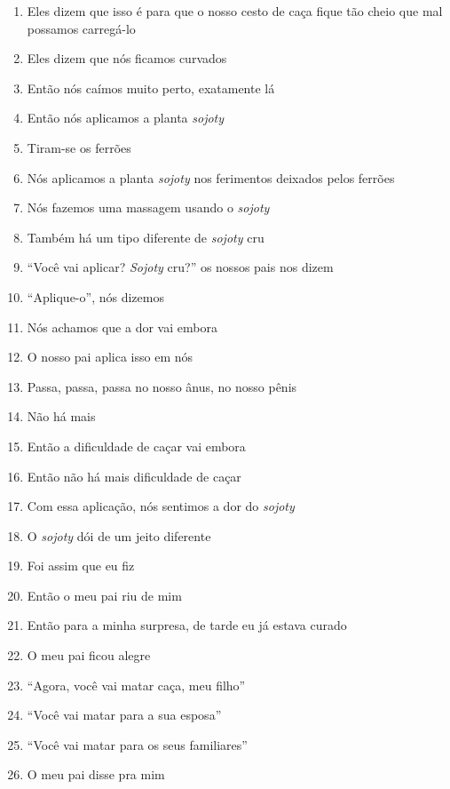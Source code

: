\begin{enumerate}
 \begin{center}\end{center}
 
 \item Eles dizem que isso é para que o nosso cesto de caça fique tão cheio
 que mal possamos carregá-lo
 \item Eles dizem que nós ficamos curvados
 \item Então nós caímos muito perto, exatamente lá
 
 \begin{center}\end{center}
 
 \item Então nós aplicamos a planta \textit{sojoty}
 \item Tiram-se os ferrões
 \item Nós aplicamos a planta \textit{sojoty} nos ferimentos deixados pelos
 ferrões
 \item Nós fazemos uma massagem usando o \textit{sojoty}
 \item Também há um tipo diferente de \textit{sojoty} cru
 \item ``Você vai aplicar? \textit{Sojoty} cru?'' os nossos pais nos dizem
 \item ``Aplique-o'', nós dizemos
 \item Nós achamos que a dor vai embora
 \item O nosso pai aplica isso em nós
 \item Passa, passa, passa no nosso ânus, no nosso pênis
 \item Não há mais
 \item Então a dificuldade de caçar vai embora
 \item Então não há mais dificuldade de caçar
 \item Com essa aplicação, nós sentimos a dor do \textit{sojoty}
 \item O \textit{sojoty} dói de um jeito diferente
 
 \begin{center}\end{center}
 
 \item Foi assim que eu fiz
 \item Então o meu pai riu de mim
 \item Então para a minha surpresa, de tarde eu já estava curado
 \item O meu pai ficou alegre
 \item ``Agora, você vai matar caça, meu filho''
 \item ``Você vai matar para a sua esposa''
 \item ``Você vai matar para os seus familiares''
 \item O meu pai disse pra mim
 

\end{enumerate}
